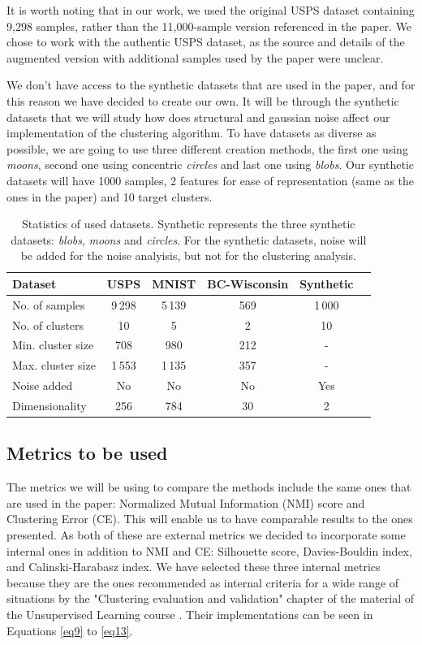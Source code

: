 \documentclass[
	10pt,
	parskip=half-,	
	paper=a4,
	english
	]{scrartcl}
\begin{document}
It is worth noting that in our work, we used the original USPS dataset containing 9,298 samples, rather than the 11,000-sample version referenced in the paper. We chose to work with the authentic USPS dataset, as the source and details of the augmented version with additional samples used by the paper were unclear.

We don't have access to the synthetic datasets that are used in the paper, and for this reason we have decided to create our own. It will be through the synthetic datasets that we will study how does structural and gaussian noise affect our implementation of the clustering algorithm. To have datasets as diverse as possible, we are going to use three different creation methods, the first one using \textit{moons}, second one using concentric \textit{circles} and last one using \textit{blobs}. Our synthetic datasets will have 1000 samples, 2 features for ease of representation (same as the ones in the paper) and 10 target clusters.

\begin{table}[h]
\centering
\caption{Statistics of used datasets. Synthetic represents the three synthetic datasets: \textit{blobs}, \textit{moons} and \textit{circles}. For the synthetic datasets, noise will be added for the noise analyisis, but not for the clustering analysis.}
\begin{tabular}{lccccc}
\toprule
\textbf{Dataset} & \textbf{USPS} & \textbf{MNIST} & \textbf{BC-Wisconsin} & \textbf{Synthetic}\\
\midrule
No. of samples     & 9\,298 & 5\,139 & 569 & 1\,000 \\
No. of clusters    & 10     & 5     & 2    & 10   \\
Min. cluster size  & 708   & 980   & 212     & - \\
Max. cluster size  & 1\,553   & 1\,135  & 357     & - \\
Noise added  & No   & No  & No     & Yes \\
Dimensionality     & 256    & 784   & 30   & 2 \\
\bottomrule
\end{tabular}
\end{table}

\subsection{Metrics to be used}

The metrics we will be using to compare the methods include the same ones that are used in the paper: Normalized Mutual Information (NMI) score and Clustering Error (CE). This will enable us to have comparable results to the ones presented. As both of these are external metrics we decided to incorporate some internal ones in addition to NMI and CE: Silhouette score, Davies-Bouldin index, and Calinski-Harabasz index. We have selected these three internal metrics because they are the ones recommended as internal criteria for a wide range of situations by the "Clustering evaluation and validation" chapter of the material of the Unsupervised Learning course \cite{citation2}. Their implementations can be seen in Equations \ref{eq9} to \ref{eq13}.
\end{document}
